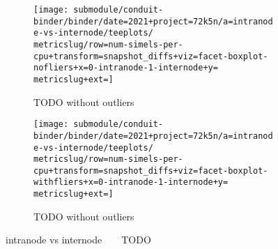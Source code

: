 \begin{figure*}
  \centering
  \begin{subfigure}[b]{0.5\textwidth}
    \centering
    \texttt{[image: submodule/conduit-binder/binder/date=2021+project=72k5n/a=intranode-vs-internode/teeplots/\\metricslug/row=num-simels-per-cpu+transform=snapshot\_diffs+viz=facet-boxplot-nofliers+x=0-intranode-1-internode+y=\\metricslug+ext=]}
    \caption{TODO without outliers}
    \label{fig:intranode-vs-internode-distribution-\metricslug-nofliers}
  \end{subfigure}%
  \begin{subfigure}[b]{0.5\textwidth}
    \centering
    \texttt{[image: submodule/conduit-binder/binder/date=2021+project=72k5n/a=intranode-vs-internode/teeplots/\\metricslug/row=num-simels-per-cpu+transform=snapshot\_diffs+viz=facet-boxplot-withfliers+x=0-intranode-1-internode+y=\\metricslug+ext=]}
    \caption{TODO without outliers}
    \label{fig:intranode-vs-internode-distribution-\metricslug-withfliers}
  \end{subfigure}
  \caption{intranode vs internode ~ \metric ~ TODO}
  \label{fig:intranode-vs-internode-distribution-\metricslug}
\end{figure*}
